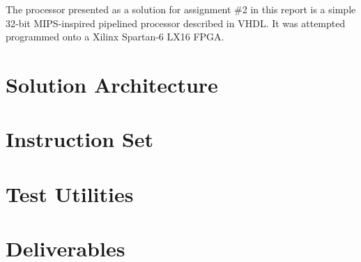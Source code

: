 The processor presented as a solution for assignment \#2 in this report is a simple 32-bit MIPS-inspired pipelined processor described in VHDL.
It was attempted programmed onto a Xilinx Spartan-6 LX16 FPGA.

\section{Solution Architecture}



\newpage
\section{Instruction Set}
\label{section:instruction-set}

 \label{sec:instruction-set}

\section{Test Utilities}



\section{Deliverables}


